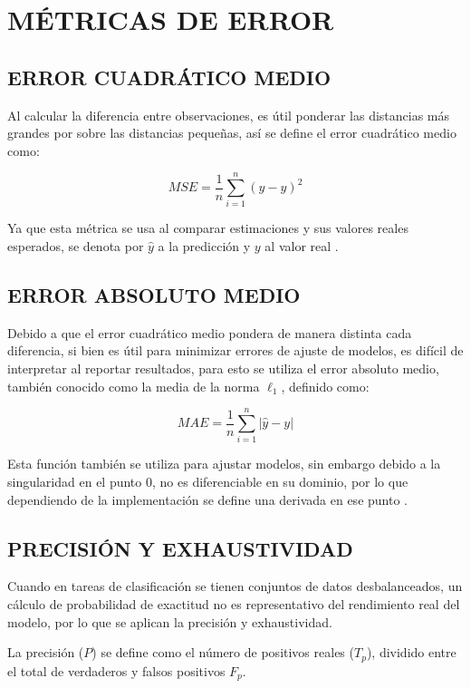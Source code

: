 \section{MÉTRICAS DE ERROR}
\subsection{ERROR CUADRÁTICO MEDIO}
Al calcular la diferencia entre observaciones, es útil ponderar las distancias más grandes por sobre las distancias pequeñas, así se define el error cuadrático medio como:

\begin{equation}
	MSE = \frac{1}{n}\sum_{i=1}^n (\hat{y} - y)^2
\end{equation}

Ya que esta métrica se usa al comparar estimaciones y sus valores reales esperados, se denota por $\hat{y}$ a la predicción y $y$ al valor real \citep{hastie01statisticallearning}.

\subsection{ERROR ABSOLUTO MEDIO}
Debido a que el error cuadrático medio pondera de manera distinta cada diferencia, si bien es útil para minimizar errores de ajuste de modelos, es difícil de interpretar al reportar resultados, para esto se utiliza el error absoluto medio, también conocido como la media de la norma $\ell_1$, definido como:

\begin{equation}
	MAE = \frac{1}{n}\sum_{i=1}^n |\hat{y} - y|
\end{equation}

Esta función también se utiliza para ajustar modelos, sin embargo debido a la singularidad en el punto $0$, no es diferenciable en su dominio, por lo que dependiendo de la implementación se define una derivada en ese punto \citep{hastie01statisticallearning}.

\subsection{PRECISIÓN Y EXHAUSTIVIDAD}
Cuando en tareas de clasificación se tienen conjuntos de datos desbalanceados, un cálculo de probabilidad de exactitud no es representativo del rendimiento real del modelo, por lo que se aplican la precisión y exhaustividad.

La precisión ($P$) se define como el número de positivos reales ($T_p$), dividido entre el total de verdaderos y falsos positivos $F_p$.

